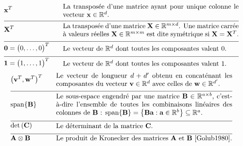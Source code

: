 \begin{align}
	&\featurevec^{T} &\quad & \parbox{.75\textwidth}{La transposée d’une matrice ayant pour unique colonne le vecteur $\featurevec \in \mathbb{R}^{\dimlocalmodel}$.} \nonumber \\[2mm] \hline \nonumber\\[-5mm]
	&\mathbf{X}^{T} &\quad & \parbox{.75\textwidth}{La transposée d’une matrice $\mathbf{X} \in \mathbb{R}^{\samplesize \times \featurelen}$. Une matrice carrée à valeurs réelles $\mathbf{X} \in \mathbb{R}^{\samplesize \times \samplesize}$ est dite symétrique si $\mathbf{X} = \mathbf{X}^{T}$.}  \nonumber \\[2mm] \hline \nonumber\\[-5mm]
	&\mathbf{0}= \big(0,\ldots,0\big)^{T}  & \quad &  \parbox{.75\textwidth}{Le vecteur de $\mathbb{R}^{\dimlocalmodel}$ dont toutes les composantes valent 0.} \nonumber \\[2mm] \hline \nonumber\\[-5mm]
	&\mathbf{1}= \big(1,\ldots,1\big)^{T}  & \quad &  \parbox{.75\textwidth}{Le vecteur de $\mathbb{R}^{\dimlocalmodel}$ dont toutes les composantes valent 1.} \nonumber
\end{align}
\newpage
\begin{align} 
	&\big(\vv^{T},\vw^{T} \big)^{T}  & \quad &  \parbox{.75\textwidth}{Le vecteur de longueur $\featurelen+\featurelen'$ obtenu en concaténant les composantes du vecteur $\vv \in \mathbb{R}^{\featurelen}$ avec celles de $\vw \in \mathbb{R}^{\featurelen'}$.} \nonumber \\[2mm] \hline \nonumber\\[-5mm]
	&	{\rm span}\{ \mathbf{B} \}  & \quad &  \parbox{.75\textwidth}{Le sous-espace engendré par une matrice $\mathbf{B} \in \mathbb{R}^{a \times b}$, c’est-à-dire l’ensemble de toutes les combinaisons linéaires des colonnes de $\mathbf{B}$ : ${\rm span}\{ \mathbf{B} \} = \big\{  \mathbf{B} \va : \va \in \mathbb{R}^{b} \big\} \subseteq \mathbb{R}^{a}$.} \nonumber \\[2mm] \hline \nonumber\\[-5mm]
	&\determinant{\mC} &\quad & \parbox{.75\textwidth}{Le déterminant de la matrice $\mC$.} \nonumber \\[2mm] \hline \nonumber\\[-5mm]
	&\mathbf{A} \otimes \mathbf{B} &\quad & \parbox{.75\textwidth}{Le produit de Kronecker des matrices $\mathbf{A}$ et $\mathbf{B}$ \cite{Golub1980}.} \nonumber
\end{align} 

\newpage

